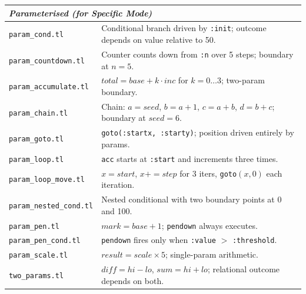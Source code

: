 {\begin{longtable}{p{} p{}}
\midrule
\multicolumn{2}{l}{\textit{Parameterised (for Specific Mode)}} \\
\midrule
\texttt{param\_cond.tl}         & Conditional branch driven by \texttt{:init}; outcome depends on value relative to 50. \\
\texttt{param\_countdown.tl}    & Counter counts down from \texttt{:n} over 5 steps; boundary at $n{=}5$. \\
\texttt{param\_accumulate.tl}   & $\mathit{total} = \mathit{base} + k \cdot \mathit{inc}$ for $k=0\ldots3$; two-param boundary. \\
\texttt{param\_chain.tl}        & Chain: $a{=}\mathit{seed}$, $b{=}a{+}1$, $c{=}a{+}b$, $d{=}b{+}c$; boundary at $\mathit{seed}{=}6$. \\
\texttt{param\_goto.tl}         & \texttt{goto(:startx, :starty)}; position driven entirely by params. \\
\texttt{param\_loop.tl}         & \texttt{acc} starts at \texttt{:start} and increments three times. \\
\texttt{param\_loop\_move.tl}   & $x{=}\mathit{start}$, $x{+}{=}\mathit{step}$ for 3 iters, \texttt{goto}$(x,0)$ each iteration. \\
\texttt{param\_nested\_cond.tl} & Nested conditional with two boundary points at 0 and 100. \\
\texttt{param\_pen.tl}          & $\mathit{mark}{=}\mathit{base}{+}1$; \texttt{pendown} always executes. \\
\texttt{param\_pen\_cond.tl}    & \texttt{pendown} fires only when \texttt{:value} $>$ \texttt{:threshold}. \\
\texttt{param\_scale.tl}        & $\mathit{result} = \mathit{scale} \times 5$; single-param arithmetic. \\
\texttt{two\_params.tl}         & $\mathit{diff}{=}\mathit{hi}{-}\mathit{lo}$, $\mathit{sum}{=}\mathit{hi}{+}\mathit{lo}$; relational outcome depends on both. \\


\end{longtable}}

